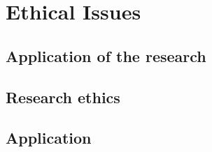 \chapter{Ethical Issues}
\begin{comment}
You are required to include a short discussion of ethical, legal, societal and professional issues that are relevant to your project (usually 1 to 2 pages long). This should fit in the most appropriate section of your project report, often the Background or Conclusions section.
\end{comment}
\section{Application of the research}
\section{Research ethics}
\section{Application}
